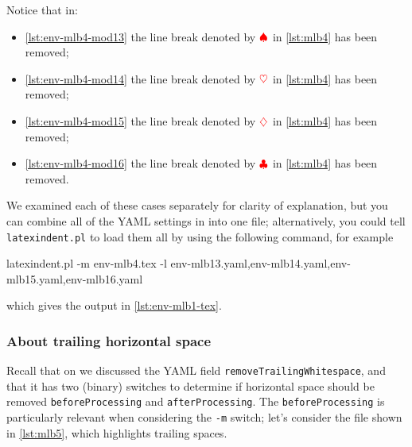 	\begin{minipage}{.45\linewidth}
	\end{minipage}
	\hfill
	\begin{minipage}{.45\linewidth}
	\end{minipage}

	Notice that in:
	\begin{itemize}
		\item \cref{lst:env-mlb4-mod13} the line break denoted by $\color{red}\spadesuit$ in \cref{lst:mlb4} has been removed;
		\item \cref{lst:env-mlb4-mod14} the line break denoted by $\color{red}\heartsuit$ in \cref{lst:mlb4} has been removed;
		\item \cref{lst:env-mlb4-mod15} the line break denoted by $\color{red}\diamondsuit$ in \cref{lst:mlb4} has been removed;
		\item \cref{lst:env-mlb4-mod16} the line break denoted by $\color{red}\clubsuit$ in \cref{lst:mlb4} has been removed.
	\end{itemize}
	We examined each of these cases separately for clarity of explanation, but you can combine all of the YAML
	settings in  into one file; alternatively, you could tell \texttt{latexindent.pl}
	to load them all by using the following command, for example
	\begin{widepage}
		\begin{commandshell}
latexindent.pl -m env-mlb4.tex -l env-mlb13.yaml,env-mlb14.yaml,env-mlb15.yaml,env-mlb16.yaml
\end{commandshell}
	\end{widepage}
	which gives the output in \vref{lst:env-mlb1-tex}.

\subsubsection{About trailing horizontal space}
	Recall that on  we discussed the YAML field \texttt{removeTrailingWhitespace},
	and that it has two (binary) switches to determine if horizontal space should be removed \texttt{beforeProcessing} and \texttt{afterProcessing}.
	The \texttt{beforeProcessing} is particularly relevant when considering the \texttt{-m} switch; let's consider the
	file shown in \cref{lst:mlb5}, which highlights trailing spaces.


